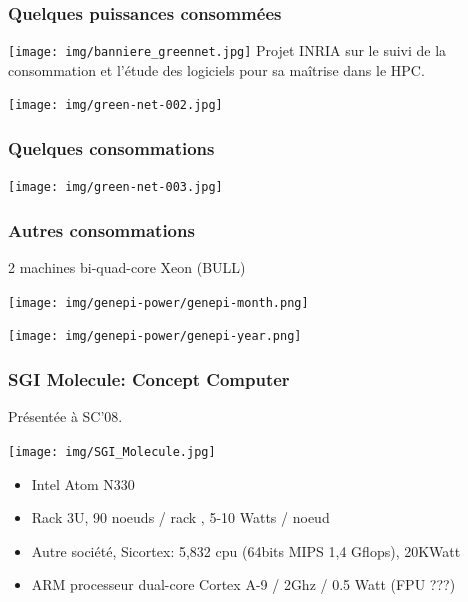 \documentclass{beamer}
\begin{document}
\begin{frame}
  \frametitle{Quelques puissances consommées}
  \texttt{[image: img/banniere\_greennet.jpg]}
  Projet INRIA sur le suivi de la consommation et l'étude des logiciels pour sa maîtrise dans le HPC.
  \begin{center}
      \texttt{[image: img/green-net-002.jpg]}
      \end{center} 

\end{frame}

\begin{frame}
  \frametitle{Quelques consommations}
 
  \begin{center}
    \texttt{[image: img/green-net-003.jpg]}
  \end{center} 

\end{frame}

\begin{frame}
  \frametitle{Autres consommations}
  2 machines bi-quad-core Xeon (BULL)
  \begin{center}
    \texttt{[image: img/genepi-power/genepi-month.png]}
  \end{center} 
  \begin{center}
    \texttt{[image: img/genepi-power/genepi-year.png]}
  \end{center} 
\end{frame}

\begin{frame}
  \frametitle{SGI Molecule: Concept Computer}
  Présentée à SC'08.
  \begin{center}
    \texttt{[image: img/SGI\_Molecule.jpg]}
  \end{center} 

	\begin{itemize}
		\item Intel Atom N330
    \item Rack 3U, 90 noeuds / rack , 5-10 Watts / noeud 
  \end{itemize}

  \begin{itemize}
		\item Autre société, Sicortex: 5,832 cpu (64bits MIPS 1,4 Gflops), 20KWatt
    \item ARM processeur dual-core Cortex A-9  / 2Ghz / 0.5 Watt (FPU ???)
  \end{itemize}

\end{frame}
\end{document}
